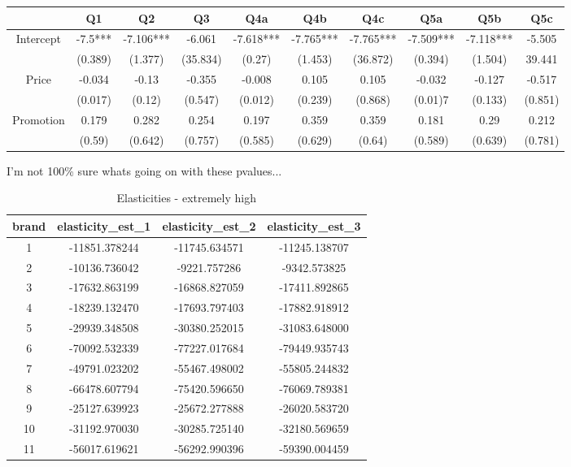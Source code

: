 \documentclass[]{article}
\begin{document}
\begin{adjustbox}{angle=90}
\centering
\begin{tabular}{|c|c c c c c c c c c|}
\hline
      & Q1	&	Q2 & Q3&	Q4a	&	Q4b	&	Q4c	&	Q5a	&	Q5b	&	Q5c \\
      \hline \hline
      
Intercept & -7.5*** & -7.106*** & -6.061  & -7.618*** & -7.765*** & -7.765*** & -7.509*** & -7.118*** & -5.505 \\
 & (0.389) & (1.377) & (35.834) & (0.27) & (1.453) & (36.872) & (0.394) & (1.504) & 39.441 \\
 [1em]
Price & -0.034  & -0.13  & -0.355  & -0.008  & 0.105  & 0.105  & -0.032  & -0.127  & -0.517\\
 & (0.017) & (0.12) & (0.547) & (0.012) & (0.239) & (0.868) & (0.01)7 & (0.133) & (0.851)\\
 [1em]
Promotion	& 0.179  & 0.282  & 0.254  & 0.197  & 0.359  & 0.359  & 0.181  & 0.29  & 0.212 \\
 & (0.59) & (0.642) & (0.757) & (0.585) & (0.629) & (0.64) & (0.589) & (0.639) & (0.781)\\[1em]\hline
 
\end{tabular}


\end{adjustbox}

I'm not 100\% sure whats going on with these pvalues...

\newpage

\begin{table}[h]
    \centering
    \begin{tabular}{|c|c c c|}
    \hline
    brand &  elasticity\_est\_1 & elasticity\_est\_2 & elasticity\_est\_3
\\\hline \hline
1    & -11851.378244   &  -11745.634571   &  -11245.138707 \\
2    & -10136.736042 & -9221.757286 & -9342.573825 \\
3    & -17632.863199& -16868.827059& -17411.892865\\
4    & -18239.132470& -17693.797403& -17882.918912\\
5    & -29939.348508& -30380.252015& -31083.648000\\
6    & -70092.532339& -77227.017684& -79449.935743\\
7    & -49791.023202& -55467.498002& -55805.244832\\
8    & -66478.607794& -75420.596650& -76069.789381\\
9    & -25127.639923& -25672.277888& -26020.583720\\
10   & -31192.970030& -30285.725140& -32180.569659\\
11   & -56017.619621& -56292.990396& -59390.004459    \\\hline

\end{tabular}
    \caption{Elasticities - extremely high}
    \label{tab:my_label}

\end{table}
\end{document}
